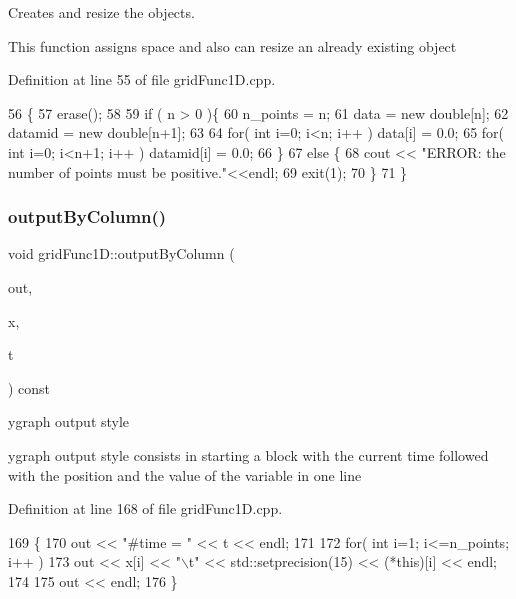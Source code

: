 Creates and resize the objects. 

This function assigns space and also can resize an already existing object 

Definition at line 55 of file grid\+Func1\+D.\+cpp.


\begin{DoxyCode}
56 \{
57   erase();
58 
59   \textcolor{keywordflow}{if} ( n > 0 )\{
60     n\_points = n;
61     data = \textcolor{keyword}{new} \textcolor{keywordtype}{double}[n];
62     datamid = \textcolor{keyword}{new} \textcolor{keywordtype}{double}[n+1];
63 
64     \textcolor{keywordflow}{for}( \textcolor{keywordtype}{int} i=0; i<n; i++ )   data[i] = 0.0;
65     \textcolor{keywordflow}{for}( \textcolor{keywordtype}{int} i=0; i<n+1; i++ ) datamid[i] = 0.0;
66   \}
67   \textcolor{keywordflow}{else} \{
68     cout << \textcolor{stringliteral}{"ERROR: the number of points must be positive."}<<endl;
69     exit(1);
70   \}
71 \}
\end{DoxyCode}
\mbox{\label{classgridFunc1D_a9843d7697659ce644eb46c127f9c57cb}} 
\subsubsection{\texorpdfstring{output\+By\+Column()}{outputByColumn()}}
{\footnotesize\ttfamily void grid\+Func1\+D\+::output\+By\+Column (\begin{DoxyParamCaption}\item[{ofstream \&}]{out,  }\item[{\hyperlink{classgridFunc1D}{grid\+Func1D} \&}]{x,  }\item[{const double}]{t }\end{DoxyParamCaption}) const}



ygraph output style 

ygraph output style consists in starting a block with the current time followed with the position and the value of the variable in one line 

Definition at line 168 of file grid\+Func1\+D.\+cpp.


\begin{DoxyCode}
169 \{
170   out << \textcolor{stringliteral}{"#time = "} << t << endl;
171 
172   \textcolor{keywordflow}{for}( \textcolor{keywordtype}{int} i=1; i<=n\_points; i++ )
173     out << x[i] << \textcolor{stringliteral}{"\(\backslash\)t"} << std::setprecision(15) << (*this)[i] << endl;
174 
175   out << endl;
176 \}
\end{DoxyCode}
\mbox{\label{classgridFunc1D_a07793d54b659a46c6a38c3fe0b70f6c2}} 
